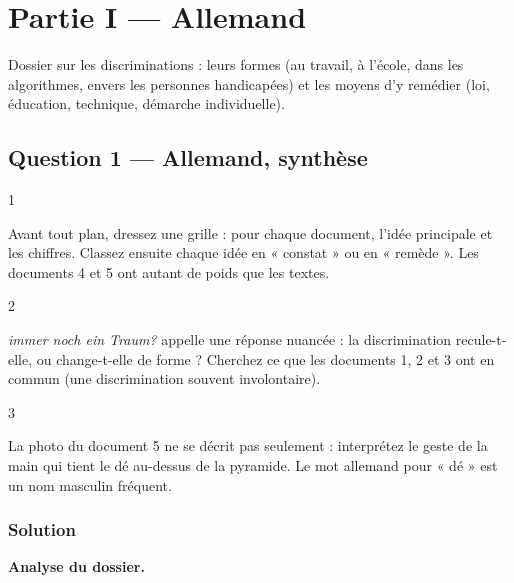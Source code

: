 \documentclass[11pt,a4paper]{article}
\begin{document}
\hypertarget{partie-i-allemand}{%
\section{Partie I --- Allemand}\label{partie-i-allemand}}

Dossier sur les discriminations : leurs formes (au travail, à l'école, dans les algorithmes, envers les personnes handicapées) et les moyens d'y remédier (loi, éducation, technique, démarche individuelle).

\hypertarget{question-1-allemand-synthuxe8se}{%
\subsection{Question 1 --- Allemand, synthèse}\label{question-1-allemand-synthuxe8se}}

\begin{indication}{1}

Avant tout plan, dressez une grille : pour chaque document, l'idée principale et les chiffres. Classez ensuite chaque idée en « constat » ou en « remède ». Les documents 4 et 5 ont autant de poids que les textes.

\end{indication}

\begin{indication}{2}

\emph{immer noch ein Traum?} appelle une réponse nuancée : la discrimination recule-t-elle, ou change-t-elle de forme ? Cherchez ce que les documents 1, 2 et 3 ont en commun (une discrimination souvent involontaire).

\end{indication}

\begin{indication}{3}

La photo du document 5 ne se décrit pas seulement : interprétez le geste de la main qui tient le dé au-dessus de la pyramide. Le mot allemand pour « dé » est un nom masculin fréquent.

\end{indication}

\hypertarget{solution}{%
\subsubsection{Solution}\label{solution}}

\textbf{Analyse du dossier.}
\end{document}
